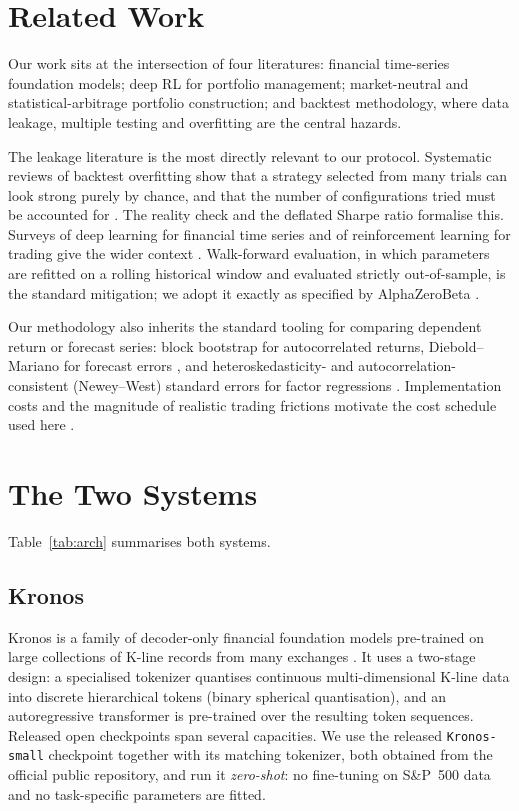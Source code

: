 \documentclass[conference]{IEEEtran}
\newcommand{\tabdir}{tables}
\begin{document}
\section{Related Work}
\label{sec:related}
Our work sits at the intersection of four literatures: financial time-series
foundation models; deep RL for portfolio management; market-neutral and
statistical-arbitrage portfolio construction; and backtest methodology, where
data leakage, multiple testing and overfitting are the central hazards.

The leakage literature is the most directly relevant to our protocol.
Systematic reviews of backtest overfitting show that a strategy selected from
many trials can look strong purely by chance, and that the number of
configurations tried must be accounted for \cite{bailey2016pbo}. The reality
check \cite{white2000snooping} and the deflated Sharpe ratio
\cite{bailey2014dsr} formalise this. Surveys of deep learning for financial
time series and of reinforcement learning for trading give the wider context
\cite{sezer2020survey,felizardo2022survey}. Walk-forward evaluation, in which
parameters are refitted on a rolling historical window and evaluated strictly
out-of-sample, is the standard mitigation; we adopt it exactly as specified by
AlphaZeroBeta \cite{belyakov2026alphazerobeta}.

Our methodology also inherits the standard tooling for comparing dependent
return or forecast series: block bootstrap for autocorrelated returns,
Diebold--Mariano for forecast errors \cite{diebold1995dm}, and
heteroskedasticity- and autocorrelation-consistent (Newey--West) standard
errors for factor regressions \cite{newey1987hac}. Implementation costs and the
magnitude of realistic trading frictions motivate the cost schedule used here
\cite{frazzini2018tradingcosts}.

\section{The Two Systems}
\label{sec:models}
Table~\ref{tab:arch} summarises both systems.



\subsection{Kronos}
Kronos is a family of decoder-only financial foundation models pre-trained on
large collections of K-line records from many exchanges \cite{shi2025kronos}. It uses a two-stage
design: a specialised tokenizer quantises continuous multi-dimensional K-line
data into discrete hierarchical tokens (binary spherical quantisation), and an
autoregressive transformer is pre-trained over the resulting token sequences.
Released open checkpoints span several capacities. We use the released
\texttt{Kronos-small} checkpoint together with its matching tokenizer, both
obtained from the official public repository, and run it \emph{zero-shot}: no
fine-tuning on S\&P~500 data and no task-specific parameters are fitted.
\end{document}
